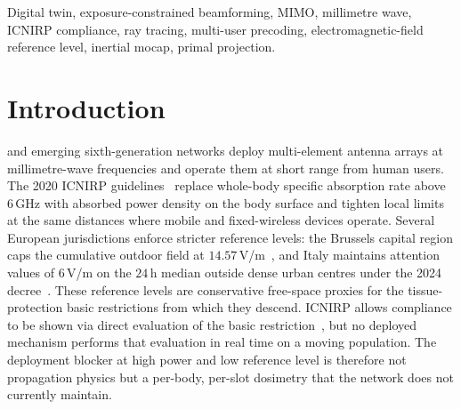 \documentclass[journal,twocolumn,10pt]{IEEEtran}
\theoremstyle{plain}
\theoremstyle{remark}
\newcommand{\xx}{\mathbf{x}}
\newcommand{\Qmat}{\mathbf{Q}}
\begin{document}
\begin{abstract}
Geometric zero-forcing and matched-ratio transmission violate the
per-body cap on $16.7\,\%$ and $35.1\,\%$ of body-slots respectively
over a 5-min steady-state walk; the proposed multi-body
MMSE-with-exposure with primal projection holds the cap to within
$3\,\%$ relative of $L^{(u)}$ on essentially every body-slot under
all three pose-telemetry sources, with sum-rate that ranks
oracle\,$<$\,IMU\,$<$\,T-pose\,$<$\,ZF reflecting the operator
tightness ladder. The standard projected-area Cauchy bound on
$\xx^H \Qmat^{(u)} \xx$ is loose by 21 to $27\,$dB on the
line-of-sight steering precoder and breached by 49 to $70\,\%$ of
random and ECBF precoders, which we trace to the geometric mismatch
between the leading exposure eigenvector and the BS-side steering
vector; the conditional Cauchy bound that does hold under a
direction-set restriction is the right object for compliance-aware
precoder design.
\end{abstract}

\begin{IEEEkeywords}
Digital twin, exposure-constrained beamforming, MIMO, millimetre wave,
ICNIRP compliance, ray tracing, multi-user precoding,
electromagnetic-field reference level, inertial mocap, primal
projection.
\end{IEEEkeywords}

\IEEEpeerreviewmaketitle


\section{Introduction}\label{sec:intro}
 and emerging sixth-generation
networks deploy multi-element antenna arrays at millimetre-wave
frequencies and operate them at short range from human users. The
2020 ICNIRP guidelines~\cite{ICNIRP2020} replace whole-body specific
absorption rate above $6\,$GHz with absorbed power density on the
body surface and tighten local limits at the same distances where
mobile and fixed-wireless devices operate. Several European
jurisdictions enforce stricter reference levels: the Brussels capital
region caps the cumulative outdoor field at
$14.57\,$V/m~\cite{BrusselsArrete2007,BrusselsArrete2024}, and Italy
maintains attention values of $6\,$V/m on the $24\,$h median outside
dense urban centres under the 2024 decree~\cite{ItalyDL}. These
reference levels are conservative free-space proxies for the
tissue-protection basic restrictions from which they descend.
ICNIRP allows compliance to be shown via direct evaluation of the
basic restriction~\cite{IEC62232}, but no deployed mechanism
performs that evaluation in real time on a moving population. The
deployment blocker at high power and low reference level is therefore
not propagation physics but a per-body, per-slot dosimetry that the
network does not currently maintain.
\end{document}
